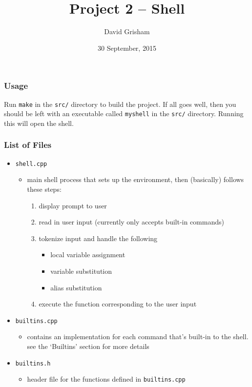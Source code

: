 \documentclass[]{article}
\title{Project 2 -- Shell}
\author{David Grisham}
\date{30 September, 2015}
\providecommand{\tightlist}{%
  \setlength{\itemsep}{0pt}\setlength{\parskip}{0pt}}
\begin{document}
\maketitle

\subsubsection{Usage}\label{usage}

Run \texttt{make} in the \texttt{src/} directory to build the project.
If all goes well, then you should be left with an executable called
\texttt{myshell} in the \texttt{src/} directory. Running this will open
the shell.

\subsubsection{List of Files}\label{list-of-files}

\begin{itemize}
\tightlist
\item
  \texttt{shell.cpp}

  \begin{itemize}
  \tightlist
  \item
    main shell process that sets up the environment, then (basically)
    follows these steps:

    \begin{enumerate}
    \def\labelenumi{\arabic{enumi}.}
    \tightlist
    \item
      display prompt to user
    \item
      read in user input (currently only accepts built-in commands)
    \item
      tokenize input and handle the following

      \begin{itemize}
      \tightlist
      \item
        local variable assignment
      \item
        variable substitution
      \item
        alias substitution
      \end{itemize}
    \item
      execute the function corresponding to the user input
    \end{enumerate}
  \end{itemize}
\item
  \texttt{builtins.cpp}

  \begin{itemize}
  \tightlist
  \item
    contains an implementation for each command that's built-in to the
    shell. see the `Builtins' section for more details
  \end{itemize}
\item
  \texttt{builtins.h}

  \begin{itemize}
  \tightlist
  \item
    header file for the functions defined in \texttt{builtins.cpp}
  \end{itemize}
\end{itemize}
\end{document}
